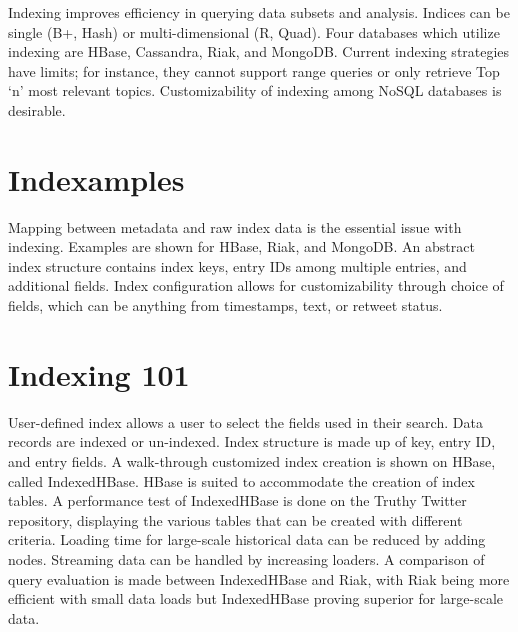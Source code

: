 Indexing improves efficiency in querying data subsets and analysis.
Indices can be single (B+, Hash) or multi-dimensional (R, Quad). Four
databases which utilize indexing are HBase, Cassandra, Riak, and
MongoDB. Current indexing strategies have limits; for instance, they
cannot support range queries or only retrieve Top `n' most relevant
topics. Customizability of indexing among NoSQL databases is desirable.




\section{Indexamples}

Mapping between metadata and raw index data is the essential issue
with indexing. Examples are shown for HBase, Riak, and MongoDB. An
abstract index structure contains index keys, entry IDs among multiple
entries, and additional fields. Index configuration allows for
customizability through choice of fields, which can be anything from
timestamps, text, or retweet status.




\section{Indexing 101}

User-defined index allows a user to select the fields used in their
search. Data records are indexed or un-indexed. Index structure is
made up of key, entry ID, and entry fields. A walk-through customized
index creation is shown on HBase, called IndexedHBase. HBase is suited
to accommodate the creation of index tables. A performance test of
IndexedHBase is done on the Truthy Twitter repository, displaying the
various tables that can be created with different criteria. Loading
time for large-scale historical data can be reduced by adding nodes.
Streaming data can be handled by increasing loaders. A comparison of
query evaluation is made between IndexedHBase and Riak, with Riak
being more efficient with small data loads but IndexedHBase proving
superior for large-scale data.

